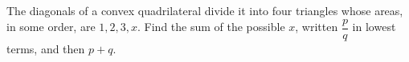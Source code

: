 The diagonals of a convex quadrilateral divide it into four triangles whose areas, in some order, are $1,2,3,x$. Find the sum of the possible $x$, written $\dfrac{p}{q}$ in lowest terms, and then $p+q$.
